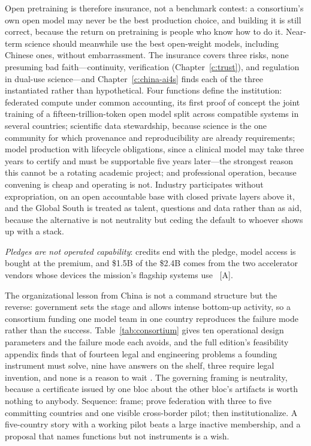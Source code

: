 

Open pretraining is therefore insurance, not a benchmark contest: a consortium's own open model may never be the best production choice, and building it is still correct, because the return on pretraining is people who know how to do it. Near-term science should meanwhile use the best open-weight models, including Chinese ones, without embarrassment. The insurance covers three risks, none presuming bad faith---continuity, verification (Chapter~\ref{c:trust}), and regulation in dual-use science---and Chapter~\ref{c:china-ai4s} finds each of the three instantiated rather than hypothetical. Four functions define the institution: federated compute under common accounting, its first proof of concept the joint training of a fifteen-trillion-token open model split across compatible systems in several countries; scientific data stewardship, because science is the one community for which provenance and reproducibility are already requirements; model production with lifecycle obligations, since a clinical model may take three years to certify and must be supportable five years later---the strongest reason this cannot be a rotating academic project; and professional operation, because convening is cheap and operating is not. Industry participates without expropriation, on an open accountable base with closed private layers above it, and the Global South is treated as talent, questions and data rather than as aid, because the alternative is not neutrality but ceding the default to whoever shows up with a stack.

\emph{Pledges are not operated capability}: credits end with the pledge, model access is bought at the premium, and \$1.5B of the \$2.4B comes from the two accelerator vendors whose devices the mission's flagship systems use~\cite{sci-cdo-genesis} [A].

The organizational lesson from China is not a command structure but the reverse: government sets the stage and allows intense bottom-up activity, so a consortium funding one model team in one country reproduces the failure mode rather than the success. Table~\ref{tab:consortium} gives ten operational design parameters and the failure mode each avoids, and the full edition's feasibility appendix finds that of fourteen legal and engineering problems a founding instrument must solve, nine have answers on the shelf, three require legal invention, and none is a reason to wait . The governing framing is neutrality, because a certificate issued by one bloc about the other bloc's artifacts is worth nothing to anybody. Sequence: frame; prove federation with three to five committing countries and one visible cross-border pilot; then institutionalize. A five-country story with a working pilot beats a large inactive membership, and a proposal that names functions but not instruments is a wish.

